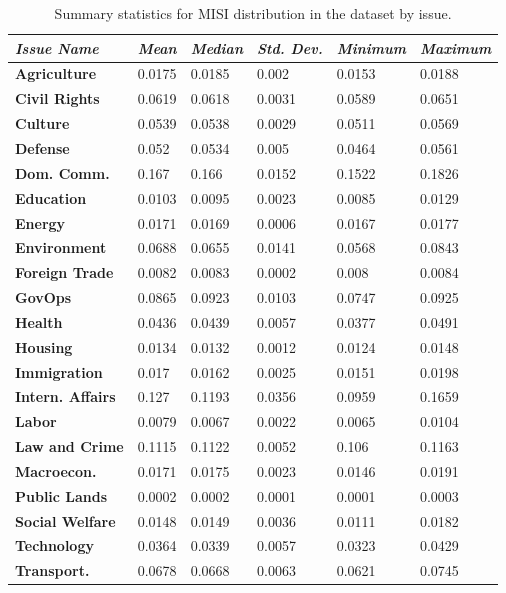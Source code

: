 \documentclass[11pt,a4paper]{article}
\begin{document}
\begin{table}
\centering
\caption{Summary statistics for MISI distribution in the dataset by issue. }
\label{tab:my_table}
\vspace{0.5cm}
\begin{tabular*}{\linewidth}{@{\extracolsep{\fill}} | l | l | l | l | l | l |}
\hline
\textit{Issue Name} & \textit{Mean} & \textit{Median} & \textit{Std. Dev.} & \textit{Minimum} & \textit{Maximum} \\
\hline
\textbf{Agriculture} & 0.0175 & 0.0185 & 0.002 & 0.0153 & 0.0188 \\
\hline
\textbf{Civil Rights} & 0.0619 & 0.0618 & 0.0031 & 0.0589 & 0.0651 \\
\hline
\textbf{Culture} & 0.0539 & 0.0538 & 0.0029 & 0.0511 & 0.0569 \\
\hline
\textbf{Defense} & 0.052 & 0.0534 & 0.005 & 0.0464 & 0.0561 \\
\hline
\textbf{Dom. Comm.} & 0.167 & 0.166 & 0.0152 & 0.1522 & 0.1826 \\
\hline
\textbf{Education} & 0.0103 & 0.0095 & 0.0023 & 0.0085 & 0.0129 \\
\hline
\textbf{Energy} & 0.0171 & 0.0169 & 0.0006 & 0.0167 & 0.0177 \\
\hline
\textbf{Environment} & 0.0688 & 0.0655 & 0.0141 & 0.0568 & 0.0843 \\
\hline
\textbf{Foreign Trade} & 0.0082 & 0.0083 & 0.0002 & 0.008 & 0.0084 \\
\hline
\textbf{GovOps} & 0.0865 & 0.0923 & 0.0103 & 0.0747 & 0.0925 \\
\hline
\textbf{Health} & 0.0436 & 0.0439 & 0.0057 & 0.0377 & 0.0491 \\
\hline
\textbf{Housing} & 0.0134 & 0.0132 & 0.0012 & 0.0124 & 0.0148 \\
\hline
\textbf{Immigration} & 0.017 & 0.0162 & 0.0025 & 0.0151 & 0.0198 \\
\hline
\textbf{Intern. Affairs} & 0.127 & 0.1193 & 0.0356 & 0.0959 & 0.1659 \\
\hline
\textbf{Labor} & 0.0079 & 0.0067 & 0.0022 & 0.0065 & 0.0104 \\
\hline
\textbf{Law and Crime} & 0.1115 & 0.1122 & 0.0052 & 0.106 & 0.1163 \\
\hline
\textbf{Macroecon.} & 0.0171 & 0.0175 & 0.0023 & 0.0146 & 0.0191 \\
\hline
\textbf{Public Lands} & 0.0002 & 0.0002 & 0.0001 & 0.0001 & 0.0003 \\
\hline
\textbf{Social Welfare} & 0.0148 & 0.0149 & 0.0036 & 0.0111 & 0.0182 \\
\hline
\textbf{Technology} & 0.0364 & 0.0339 & 0.0057 & 0.0323 & 0.0429 \\
\hline
\textbf{Transport.} & 0.0678 & 0.0668 & 0.0063 & 0.0621 & 0.0745 \\
\hline

\end{tabular*}

\end{table}
\end{document}
